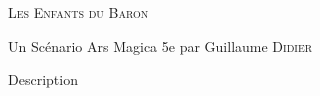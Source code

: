 \begin{center}
\vfill
    {\Large\scshape Les Enfants du Baron\par}
    \vspace{0.5cm}
{Un Scénario Ars Magica 5e par Guillaume \textsc{Didier}\par}
    \vfill
    {\LARGE\bfseries \magusname \par}



\vfill
    \begin{center}
        \parbox{.8\textwidth}{
            Description}
    \end{center}
\vfill
\end{center}
\pagebreak

\shortsheet{}



